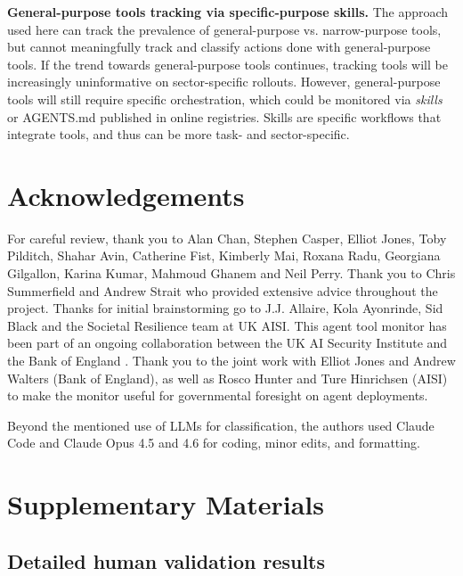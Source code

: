 \documentclass[manuscript,screen,nonacm,oneside]{acmart}
\begin{document}
\textbf{General-purpose tools tracking via specific-purpose skills.} The approach used here can track the prevalence of general-purpose vs. narrow-purpose tools, but cannot meaningfully track and classify actions done with general-purpose tools. If the trend towards general-purpose tools continues, tracking tools will be increasingly uninformative on sector-specific rollouts. However, general-purpose tools will still require specific orchestration, which could be monitored via \emph{skills} or AGENTS.md \citep{agentsAGENTSmd} published in online registries. Skills are specific workflows that integrate tools, and thus can be more task- and sector-specific.

\section*{Acknowledgements}

For careful review, thank you to Alan Chan, Stephen Casper, Elliot Jones, Toby Pilditch, Shahar Avin, Catherine Fist, Kimberly Mai, Roxana Radu, Georgiana Gilgallon, Karina Kumar, Mahmoud Ghanem and Neil Perry. Thank you to Chris Summerfield and Andrew Strait who provided extensive advice throughout the project. Thanks for initial brainstorming go to J.J. Allaire, Kola Ayonrinde, Sid Black and the Societal Resilience team at UK AISI. This agent tool monitor has been part of an ongoing collaboration between the UK AI Security Institute and the Bank of England \citep{bankofenglandBankEnglands}. Thank you to the joint work with Elliot Jones and Andrew Walters (Bank of England), as well as Rosco Hunter and Ture Hinrichsen (AISI) to make the monitor useful for governmental foresight on agent deployments.

Beyond the mentioned use of LLMs for classification, the authors used Claude Code and Claude Opus 4.5 and 4.6 for coding, minor edits, and formatting.




\appendix

\section{Supplementary Materials}

\subsection{Detailed human validation results}
\label{app:validation}
\end{document}
